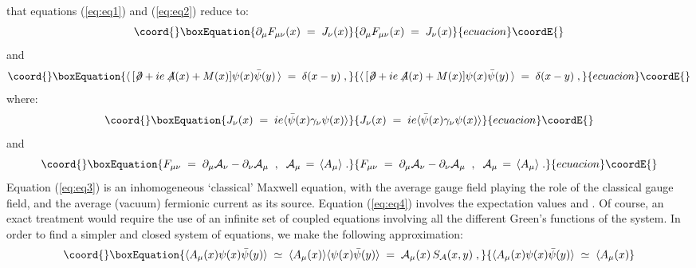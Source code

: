 \documentclass[a4paper,12pt]{article}
\begin{document}
that equations (\ref{eq:eq1}) and ({\ref{eq:eq2}) reduce to:
\begin{equation}\coord{}\boxEquation{
   \label{eq:eq3}
\partial_\mu F_{\mu\nu}(x) \;=\; J_\nu(x)
}{
   \partial_\mu F_{\mu\nu}(x) \;=\; J_\nu(x)
}{ecuacion}\coordE{}\end{equation}
and
\begin{equation}\coord{}\boxEquation{
   \label{eq:eq4}
\langle \, [\not\! \partial + i e \not \!\!A(x) + M(x)]
\psi(x) {\bar\psi}(y) \, \rangle \;=\; \delta (x-y) \;,
}{
   \langle \, [\not\! \partial + i e \not \!\!A(x) + M(x)]
\psi(x) {\bar\psi}(y) \, \rangle \;=\; \delta (x-y) \;,
}{ecuacion}\coordE{}\end{equation}
where:
\begin{equation}\coord{}\boxEquation{
   \label{eq:defJ}
J_\nu(x)  \;=\;  i e \langle {\bar \psi}(x) \gamma_\nu \psi(x) \rangle
}{
   J_\nu(x)  \;=\;  i e \langle {\bar \psi}(x) \gamma_\nu \psi(x) \rangle
}{ecuacion}\coordE{}\end{equation}
and
\begin{equation}\coord{}\boxEquation{
   \label{eq:deff}
F_{\mu\nu}\;=\; \partial_\mu {\mathcal A}_\nu - \partial_\nu {\mathcal A}_\mu\;\;,\;\; {\mathcal A}_\mu
\,=\,\langle A_\mu\rangle \;.
}{
   F_{\mu\nu}\;=\; \partial_\mu {\mathcal A}_\nu - \partial_\nu {\mathcal A}_\mu\;\;,\;\; {\mathcal A}_\mu
\,=\,\langle A_\mu\rangle \;.
}{ecuacion}\coordE{}\end{equation}
Equation (\ref{eq:eq3}) is an inhomogeneous `classical' Maxwell
equation, with the average gauge field \mbox{\coordHE{}} playing the role of the classical gauge
field, and the average (vacuum) fermionic current \coordHE{} as its
source.  Equation ({\ref{eq:eq4}) involves the expectation values
  \mbox{\myHighlight{$\langle \psi {\bar\psi}\rangle$}\coordHE{}} and {\coordHE{}}. Of course, an exact treatment would require
  the use of an infinite set of coupled equations involving all the
  different Green's functions of the system.  In order to find a
  simpler and closed system of equations, we make the following
  approximation:
\begin{equation}\coord{}\boxEquation{
   \label{eq:approx}
\langle A_\mu (x) \psi(x) {\bar\psi}(y) \rangle \;\simeq\; \langle A_\mu (x)
\rangle \langle \psi (x) {\bar\psi} (y) \rangle \;=\;
{\mathcal A}_\mu(x) \, S_{\mathcal A}(x,y) \;,
}{
   \langle A_\mu (x) \psi(x) {\bar\psi}(y) \rangle \;\simeq\; \langle A_\mu (x)
}
\end{equation}}}
\end{document}
